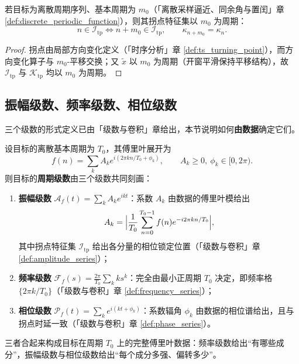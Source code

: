 \begin{proposition}[拐点特征集承载周期信息]\label{prop:ps_inflection_carries_period}
若目标为离散周期序列、基本周期为 $m_0$（「离散采样逼近、同余角与置闰」章 \cref{def:discrete_periodic_function}），则其拐点特征集以 $m_0$ 为周期：
\[
n\in\mathcal{I}_{\mathrm{tp}}\iff n+m_0\in\mathcal{I}_{\mathrm{tp}},
\qquad
\kappa_{n+m_0}=\kappa_n .
\]
\end{proposition}

\begin{proof}
拐点由局部方向变化定义（「时序分析」章 \cref{def:ts_turning_point}），而方向变化算子与 $m_0$-平移交换；又 $\tilde{x}$ 以 $m_0$ 为周期（开窗平滑保持平移结构），故 $\mathcal{I}_{\mathrm{tp}}$ 与 $\mathcal{K}_{\mathrm{tp}}$ 均以 $m_0$ 为周期。
\end{proof}

\subsection{振幅级数、频率级数、相位级数}

三个级数的形式定义已由「级数与卷积」章给出，本节说明如何\textbf{由数据}确定它们。

\begin{theorem}[由拐点构建周期级数]\label{thm:ps_series_reconstruction}
设目标的离散基本周期为 $T_0$，其傅里叶展开为
\[
f(n)=\sum_{k}A_ke^{i(2\pi kn/T_0+\phi_k)},\qquad A_k\ge0,\ \phi_k\in[0,2\pi).
\]
则目标的\textbf{周期级数}由三个级数共同刻画：
\begin{enumerate}[label=(\roman*)]
    \item \textbf{振幅级数} $\mathcal{A}_f(t)=\sum_kA_ke^{ikt}$：系数 $A_k$ 由数据的傅里叶模给出
    \[
    A_k=\Bigl|\frac1{T_0}\sum_{n=0}^{T_0-1}f(n)e^{-i2\pi kn/T_0}\Bigr|,
    \]
    其中拐点特征集 $\mathcal{I}_{\mathrm{tp}}$ 给出各分量的相位锁定位置（「级数与卷积」章 \cref{def:amplitude_series}）；
    \item \textbf{频率级数} $\mathcal{F}_f(s)=\frac{2\pi}{T_0}\sum_k ks^k$：完全由最小正周期 $T_0$ 决定，即频率格 $\{2\pi k/T_0\}$（「级数与卷积」章 \cref{def:frequency_series}）；
    \item \textbf{相位级数} $\mathcal{P}_f(t)=\sum_ke^{i(kt+\phi_k)}$：系数辐角 $\phi_k$ 由数据的相位谱给出，且与拐点时延一致（「级数与卷积」章 \cref{def:phase_series}）。
\end{enumerate}
三者合起来构成目标在周期 $T_0$ 上的完整傅里叶数据：频率级数给出“有哪些成分”，振幅级数与相位级数给出“每个成分多强、偏转多少”。
\end{theorem}

